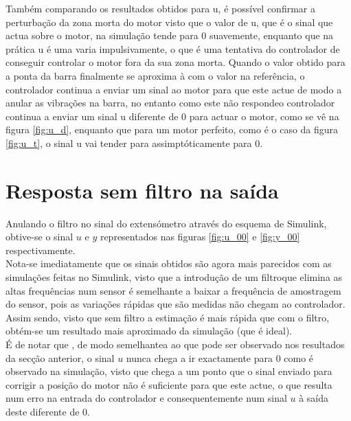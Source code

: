 \documentclass[%
  reprint,
  nofootinbib,
  amsmath,amssymb,
  aps,
  10pt,
  a4paper
]{revtex4-1}
\begin{document}
Também comparando os resultados obtidos para u, é possível confirmar a perturbação da zona morta do motor visto que o valor de u, que é o sinal que actua sobre o motor,  na simulação tende para 0 suavemente, enquanto que na prática u é uma varia impulsivamente, o que é uma tentativa do controlador de conseguir controlar o motor fora da sua zona morta. Quando o valor obtido para a ponta da barra finalmente se aproxima à com o valor na referência, o controlador continua a enviar um sinal ao motor para que este actue de modo a anular as vibrações na barra, no entanto como este não respondeo controlador continua a enviar um  sinal u diferente de 0 para actuar o motor, como se vê na figura \ref{fig:u_d}, enquanto que para um motor perfeito, como é o caso da figura \ref{fig:u_t}, o sinal u vai tender para assimptóticamente para 0.
\section{Resposta sem filtro na saída}
Anulando o filtro no sinal do extensómetro através do esquema de Simulink, obtive-se o sinal $u$ e $y$ representados nas figuras \ref{fig:u_00} e \ref{fig:y_00} respectivamente.\\
Nota-se imediatamente que os sinais obtidos são agora mais parecidos com as simulações feitas no Simulink, visto que a introdução de um filtroque elimina as altas frequências num sensor é semelhante a baixar a frequência de amostragem do sensor, pois as variações rápidas que são medidas não chegam ao controlador. Assim sendo, visto que sem filtro a estimação é mais rápida que com o filtro, obtém-se um resultado mais aproximado da simulação (que é ideal).\\
É de notar que , de modo semelhantea ao que pode ser observado nos resultados da secção anterior, o sinal $u$ nunca chega a ir exactamente para 0 como é observado na simulação, visto que chega a um ponto que o sinal enviado para corrigir a posição do motor não é suficiente para que este actue, o que resulta num erro na entrada do controlador e consequentemente num sinal $u$ à saída deste diferente de 0.
\end{document}
